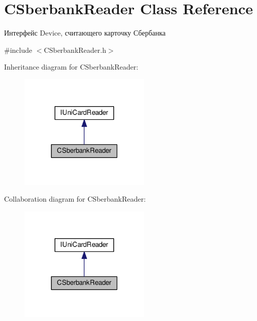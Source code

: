 \hypertarget{classCSberbankReader}{}\section{C\+Sberbank\+Reader Class Reference}
\label{classCSberbankReader}


Интерфейс Device, считающего карточку Сбербанка  




{\ttfamily \#include $<$C\+Sberbank\+Reader.\+h$>$}



Inheritance diagram for C\+Sberbank\+Reader\+:\nopagebreak
\begin{figure}[H]
\begin{center}
\leavevmode
\includegraphics[width=177pt]{classCSberbankReader__inherit__graph}
\end{center}
\end{figure}


Collaboration diagram for C\+Sberbank\+Reader\+:\nopagebreak
\begin{figure}[H]
\begin{center}
\leavevmode
\includegraphics[width=177pt]{classCSberbankReader__coll__graph}
\end{center}
\end{figure}
